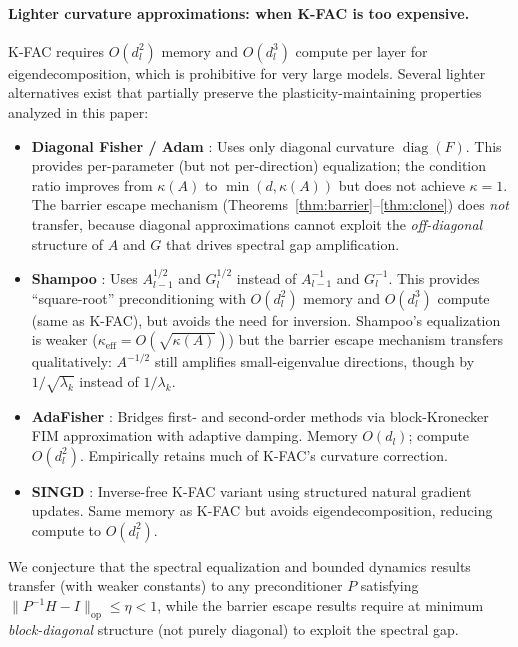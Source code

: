 \documentclass{article}
\providecommand{\norm}[1]{\lVert #1 \rVert}
\DeclareMathOperator{\diag}{diag}
\theoremstyle{plain}
\theoremstyle{definition}
\theoremstyle{remark}
\begin{document}
\paragraph{Lighter curvature approximations: when K-FAC is too expensive.}
K-FAC requires $O(d_l^2)$ memory and $O(d_l^3)$ compute per layer for eigendecomposition, which is prohibitive for very large models. Several lighter alternatives exist that partially preserve the plasticity-maintaining properties analyzed in this paper:
\begin{itemize}
    \item \textbf{Diagonal Fisher / Adam} \citep{lin2024sqrt}: Uses only diagonal curvature $\diag(F)$. This provides per-parameter (but not per-direction) equalization; the condition ratio improves from $\kappa(A)$ to $\min(d, \kappa(A))$ but does not achieve $\kappa = 1$. The barrier escape mechanism (Theorems~\ref{thm:barrier}--\ref{thm:clone}) does \emph{not} transfer, because diagonal approximations cannot exploit the \emph{off-diagonal} structure of $A$ and $G$ that drives spectral gap amplification.
    \item \textbf{Shampoo} \citep{gupta2018shampoo, morwani2025shampoo}: Uses $A_{l-1}^{1/2}$ and $G_l^{1/2}$ instead of $A_{l-1}^{-1}$ and $G_l^{-1}$. This provides ``square-root'' preconditioning with $O(d_l^2)$ memory and $O(d_l^3)$ compute (same as K-FAC), but avoids the need for inversion. Shampoo's equalization is weaker ($\kappa_{\mathrm{eff}} = O(\sqrt{\kappa(A)})$) but the barrier escape mechanism transfers qualitatively: $A^{-1/2}$ still amplifies small-eigenvalue directions, though by $1/\sqrt{\lambda_k}$ instead of $1/\lambda_k$.
    \item \textbf{AdaFisher} \citep{adafisher2025}: Bridges first- and second-order methods via block-Kronecker FIM approximation with adaptive damping. Memory $O(d_l)$; compute $O(d_l^2)$. Empirically retains much of K-FAC's curvature correction.
    \item \textbf{SINGD} \citep{lin2024singd}: Inverse-free K-FAC variant using structured natural gradient updates. Same memory as K-FAC but avoids eigendecomposition, reducing compute to $O(d_l^2)$.
\end{itemize}
We conjecture that the spectral equalization and bounded dynamics results transfer (with weaker constants) to any preconditioner $P$ satisfying $\norm{P^{-1}H - I}_{\mathrm{op}} \leq \eta < 1$, while the barrier escape results require at minimum \emph{block-diagonal} structure (not purely diagonal) to exploit the spectral gap.
\end{document}
